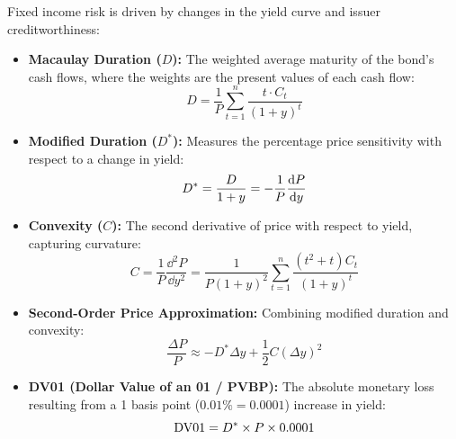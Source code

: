 Fixed income risk is driven by changes in the yield curve and issuer creditworthiness:
\begin{itemize}[leftmargin=1.5em, itemsep=2pt]
    \item \textbf{Macaulay Duration ($D$):} The weighted average maturity of the bond's cash flows, where the weights are the present values of each cash flow:
    \begin{equation}
    D = \frac{1}{P} \sum_{t=1}^n \frac{t \cdot C_t}{(1 + y)^t}
    \end{equation}
    \item \textbf{Modified Duration ($D^*$):} Measures the percentage price sensitivity with respect to a change in yield:
    \begin{equation}
    D^* = \frac{D}{1 + y} = -\frac{1}{P} \frac{\mathrm{d} P}{\mathrm{d} y}
    \end{equation}
    \item \textbf{Convexity ($C$):} The second derivative of price with respect to yield, capturing curvature:
    \begin{equation}
    C = \frac{1}{P} \frac{\dd^2 P}{\dd y^2} = \frac{1}{P (1 + y)^2} \sum_{t=1}^n \frac{(t^2 + t) C_t}{(1 + y)^t}
    \end{equation}
    \item \textbf{Second-Order Price Approximation:} Combining modified duration and convexity:
    \begin{equation}
    \frac{\Delta P}{P} \approx -D^* \Delta y + \frac{1}{2} C (\Delta y)^2
    \end{equation}
    \item \textbf{DV01 (Dollar Value of an 01 / PVBP):} The absolute monetary loss resulting from a 1 basis point ($0.01\% = 0.0001$) increase in yield:
    \begin{equation}
    \operatorname{DV01} = D^* \times P \times 0.0001
    \end{equation}
\end{itemize}

